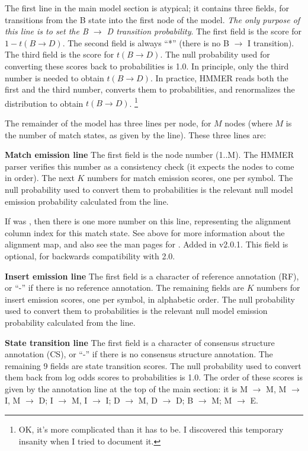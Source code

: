 The first line in the main model section is atypical; it contains
three fields, for transitions from the B state into the first node of
the model. \textit{The only purpose of this line is to set the B
$\rightarrow$ D transition probability}. The first field is the score
for $ 1 - t(B \rightarrow D)$. The second field is always ``*'' (there
is no B $\rightarrow$ I transition). The third field is the score for
$t(B\rightarrow D)$. The null probability used for converting these
scores back to probabilities is 1.0. In principle, only the third
number is needed to obtain $t(B \rightarrow D)$.  In practice, HMMER
reads both the first and the third number, converts them to
probabilities, and renormalizes the distribution to obtain $t(B
\rightarrow D)$. \footnote{OK, it's more complicated than it has to
be. I discovered this temporary insanity when I tried to document it.}

The remainder of the model has three lines per node, for $M$ nodes
(where $M$ is the number of match states, as given by the 
line). These three lines are:

\begin{wideitem}

\item [\textbf{Match emission line}] The first field is the node number (1..M).
The HMMER parser verifies this number as a consistency check (it
expects the nodes to come in order). The next $K$ numbers for match
emission scores, one per symbol. The null probability used to convert
them to probabilities is the relevant null model emission probability
calculated from the  line.

If  was , then there is one more number on this
line, representing the alignment column index for this match state.
See  above for more information about the alignment map, and
also see the man pages for .  Added in
v2.0.1. This field is optional, for backwards compatibility with 2.0.

\item [\textbf{Insert emission line}] The first field is a character of
reference annotation (RF), or ``-'' if there is no reference
annotation. The remaining fields are $K$ numbers for insert emission
scores, one per symbol, in alphabetic order. The null probability used
to convert them to probabilities is the relevant null model emission
probability calculated from the  line.

\item [\textbf{State transition line}] The first field is a character
of consensus structure annotation (CS), or ``-'' if there is no
consensus structure annotation. The remaining 9 fields are state
transition scores. The null probability used to convert them back from
log odds scores to probabilities is 1.0. The order of these scores is
given by the annotation line at the top of the main section: it is M
$\rightarrow$ M, M $\rightarrow$ I, M $\rightarrow$ D; I $\rightarrow$
M, I $\rightarrow$ I; D $\rightarrow$ M, D $\rightarrow$ D; B
$\rightarrow$ M; M $\rightarrow$ E.

\end{wideitem}

